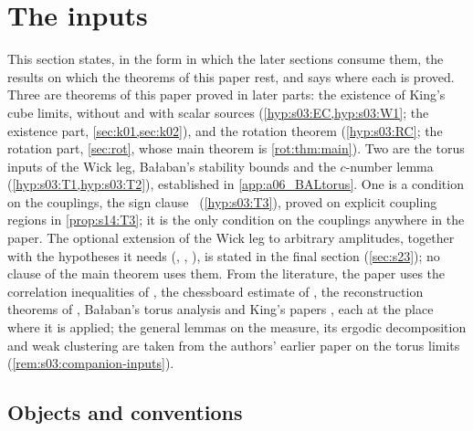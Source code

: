 \section{The inputs}\label{sec:s03}

This section states, in the form in which the later sections consume them, the results on which the theorems of this paper rest, and says where each is proved. Three are theorems of this paper proved in later parts: the existence of King's cube limits, without and with scalar sources (\cref{hyp:s03:EC,hyp:s03:W1}; the existence part, \cref{sec:k01,sec:k02}), and the rotation theorem (\cref{hyp:s03:RC}; the rotation part, \cref{sec:rot}, whose main theorem is \cref{rot:thm:main}). Two are the torus inputs of the Wick leg, Ba{\l}aban's stability bounds and the $c$-number lemma (\cref{hyp:s03:T1,hyp:s03:T2}), established in \cref{app:a06_BALtorus}. One is a condition on the couplings, the sign clause \Tthree\ (\cref{hyp:s03:T3}), proved on explicit coupling regions in \cref{prop:s14:T3}; it is the only condition on the couplings anywhere in the paper. The optional extension of the Wick leg to arbitrary amplitudes, together with the hypotheses it needs (\Wtwo, \RW, \FAK), is stated in the final section (\cref{sec:s23}); no clause of the main theorem uses them. From the literature, the paper uses the correlation inequalities of \cite{BFS1}, the chessboard estimate of \cite{FILS78}, the reconstruction theorems of \cite{OS73,OS75}, Ba{\l}aban's torus analysis \cite{Ba1,Ba2,Ba3,Ba4} and King's papers \cite{K1,K2}, each at the place where it is applied; the general lemmas on the measure, its ergodic decomposition and weak clustering are taken from the authors' earlier paper on the torus limits \cite{SymPhase} (\cref{rem:s03:companion-inputs}).

\subsection{Objects and conventions}

